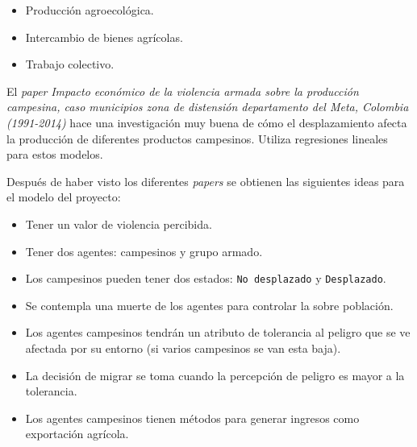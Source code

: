 \documentclass[12pt]{article}
\begin{document}
\begin{itemize}
  \item Producción agroecológica.
  \item Intercambio de bienes agrícolas.
  \item Trabajo colectivo.
\end{itemize}

El \textit{paper} \textit{Impacto económico de la violencia armada sobre la producción campesina, caso municipios zona de distensión departamento del Meta, Colombia (1991-2014)}\cite{perez2016impacto} hace una investigación muy buena de cómo el desplazamiento afecta la producción de diferentes productos campesinos. Utiliza regresiones lineales para estos modelos.


Después de haber visto los diferentes \textit{papers} se obtienen las siguientes ideas para el modelo del proyecto:

\begin{itemize}
  \item Tener un valor de violencia percibida.
  \item Tener dos agentes: campesinos y grupo armado.
  \item Los campesinos pueden tener dos estados: \texttt{No desplazado} y \texttt{Desplazado}.
  \item Se contempla una muerte de los agentes para controlar la sobre población.
  \item Los agentes campesinos tendrán un atributo de tolerancia al peligro que se ve afectada por su entorno (si varios campesinos se van esta baja).
  \item La decisión de migrar se toma cuando la percepción de peligro es mayor a la tolerancia.
  \item Los agentes campesinos tienen métodos para generar ingresos como exportación agrícola.
\end{itemize}




\end{document}
